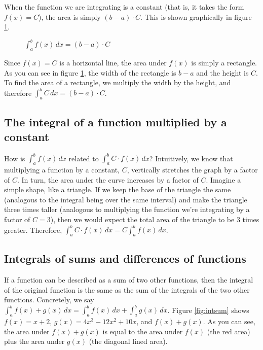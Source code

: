 When the function we are integrating is a constant (that is, it takes 
the form $f(x) = C$), the area is simply $(b - a) \cdot C$. This is 
shown graphically in figure \ref{fig:constant}. 

\begin{figure}[htbp]
	\centering
    \caption{$\int_a^b f(x)\,dx = (b - a)\cdot C$}
    \label{fig:constant}
\end{figure}

Since $f(x) = C$ is a horizontal line, the area under $f(x)$ is simply 
a rectangle. As you can see in figure \ref{fig:constant}, the width of 
the rectangle is $b - a$ and the height is $C$. To find the area of a 
rectangle, we multiply the width by the height, and therefore $\int_a^b 
C\,dx = (b - a)\cdot C$.

\subsection{The integral of a function multiplied by a constant}
How is $\int_a^b f(x)\,dx$ related to $\int_a^b C \cdot f(x)\,dx$? 
Intuitively, we know that multiplying a function by a constant, $C$, 
vertically stretches the graph by a factor of $C$. In turn, the area 
under the curve increases by a factor of $C$. Imagine a simple shape, 
like a triangle. If we keep the base of the triangle the same 
(analogous to the integral being over the same interval) and make the 
triangle three times taller (analogous to multiplying the function 
we're integrating by a factor of $C = 3$), then we would expect the 
total area of the triangle to be 3 times greater. Therefore, 
$\int_a^b C \cdot f(x)\,dx = C \int_a^b f(x)\,dx$. 

\subsection{Integrals of sums and differences of functions}
If a function can be described as a sum of two other functions, then 
the integral of the original function is the same as the sum of the 
integrals of the two other functions. Concretely, we say $\int_a^b 
f(x) + g(x)\,dx = \int_a^b f(x)\,dx + \int_a^b g(x)\,dx$. Figure 
\ref{fig:intsum} shows $f(x) = x + 2$, $g(x) = 4x^3-12x^2+10x$, and 
$f(x) + g(x)$. As you can see, the area under $f(x) + g(x)$ is equal 
to the area under $f(x)$ (the red area) plus the area under $g(x)$ 
(the diagonal lined area). 

